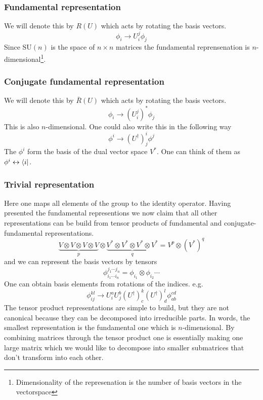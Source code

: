 \documentclass[a4paper,12pt]{article}
\begin{document}
\subsubsection{Fundamental representation}
We will denote this by $R(U)$ which acts by rotating the basis vectors. 
\begin{equation}
\phi_i\to U_i^j \phi_j
\end{equation}
Since SU$(n)$ is the space of $n\times n$ matrices the fundamental reprensenation is $n$-dimensional\footnote{Dimensionality of the represenation is the number of basis vectors in the vectorspace}.
\subsubsection{Conjugate fundamental representation}
We will denote this by $\bar R(U)$ which acts by rotating the basis vectors. 
\begin{equation}
	\phi_i\to (U_i^j)^* \phi_j
\end{equation}
This is also $n$-dimensional. One could also write this in the following way
\begin{equation}
	\phi^i\to (U^\dagger)^i_j \phi^j
\end{equation}
The $\phi^i$ form the basis of the dual vector space $V^*$. One can think of them as $\phi^i\leftrightarrow\bra{i}$.
\subsubsection{Trivial representation}
Here one maps all elements of the group to the identity operator. Having presented the fundamental representions we now claim that all other representations can be build from tensor products of fundamental and conjugate-fundamental representations.
\begin{equation}
\underbrace{V\otimes V\otimes V\otimes V}_p\otimes \underbrace{V^*\otimes V^*\otimes V^*\otimes V^*}_q=V^p\otimes (V^*)^q
\end{equation}
and we can represent the basis vectors by tensors
\begin{equation}
\phi_{i_1\cdots i_n}^{j_1\cdots j_n}=\phi_{i_1}\otimes\phi_{i_2}\cdots
\end{equation}
One can obtain basis elements from rotations of the indices. e.g.
\begin{equation}
	\phi_{ij}^{kl}\to U_i^a U_j^b (U^\dagger)^k_c (U^\dagger)^l_d \phi_{ab}^{cd}
\end{equation}
The tensor product representations are simple to build, but they are not canonical because they can be decomposed into irreducible parts. In words, the smallest representation is the fundamental one which is $n$-dimensional. By combining matrices through the tensor product one is essentially making one large matrix which we would like to decompose into smaller submatrices that don't transform into each other.
\end{document}
